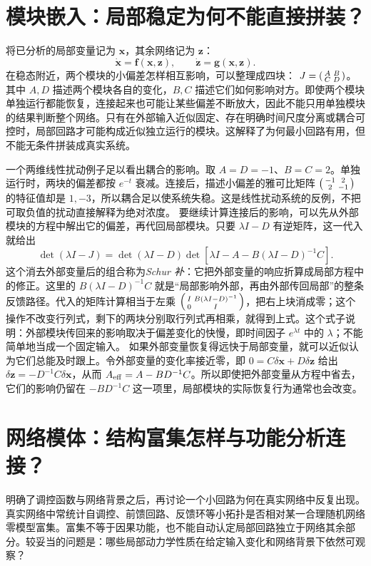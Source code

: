 \section{模块嵌入：局部稳定为何不能直接拼装？}
将已分析的局部变量记为 $\bm x$，其余网络记为 $\bm z$：
\begin{equation}\dot{\bm x}=\bm f(\bm x,\bm z),\qquad\dot{\bm z}=\bm g(\bm x,\bm z).\end{equation}
在稳态附近，两个模块的小偏差怎样相互影响，可以整理成四块： $J=\begin{psmallmatrix}A&B\\C&D\end{psmallmatrix}$。其中 $A,D$ 描述两个模块各自的变化，$B,C$ 描述它们如何影响对方。即使两个模块单独运行都能恢复，连接起来也可能让某些偏差不断放大，因此不能只用单独模块的结果判断整个网络。只有在外部输入近似固定、存在明确时间尺度分离或耦合可控时，局部回路才可能构成近似独立运行的模块。这解释了为何最小回路有用，但不能无条件拼装成真实系统。

一个两维线性扰动例子足以看出耦合的影响。取 $A=D=-1$、$B=C=2$。单独运行时，两块的偏差都按 $e^{-t}$ 衰减。连接后，描述小偏差的雅可比矩阵
$\begin{psmallmatrix}-1&2\\2&-1\end{psmallmatrix}$ 的特征值却是 $1,-3$，所以耦合足以使系统失稳。这是线性扰动系统的反例，不把可取负值的扰动直接解释为绝对浓度。
要继续计算连接后的影响，可以先从外部模块的方程中解出它的偏差，再代回局部模块。只要 $\lambda I-D$ 有逆矩阵，这一代入就给出
\[
\det(\lambda I-J)=\det(\lambda I-D)
\det\left[\lambda I-A-B(\lambda I-D)^{-1}C\right].
\]
这个消去外部变量后的组合称为\emph{Schur 补}：它把外部变量的响应折算成局部方程中的修正。这里的 $B(\lambda I-D)^{-1}C$ 就是“局部影响外部，再由外部传回局部”的整条反馈路径。代入的矩阵计算相当于左乘 $\begin{psmallmatrix}I&B(\lambda I-D)^{-1}\\0&I\end{psmallmatrix}$，把右上块消成零；这个操作不改变行列式，剩下的两块分别取行列式再相乘，就得到上式。这个式子说明：外部模块传回来的影响取决于偏差变化的快慢，即时间因子 $e^{\lambda t}$ 中的 $\lambda$；不能简单地当成一个固定输入。
如果外部变量恢复得远快于局部变量，就可以近似认为它们总能及时跟上。令外部变量的变化率接近零，即 $0=C\delta\bm x+D\delta\bm z$ 给出 $\delta\bm z=-D^{-1}C\delta\bm x$，从而 $A_{\rm eff}=A-BD^{-1}C$。所以即使把外部变量从方程中省去，它们的影响仍留在 $-BD^{-1}C$ 这一项里，局部模块的实际恢复行为通常也会改变。

\section{网络模体：结构富集怎样与功能分析连接？}
明确了调控函数与网络背景之后，再讨论一个小回路为何在真实网络中反复出现。
真实网络中常统计自调控、前馈回路、反馈环等小拓扑是否相对某一合理随机网络零模型富集。富集不等于因果功能，也不能自动认定局部回路独立于网络其余部分。较妥当的问题是：哪些局部动力学性质在给定输入变化和网络背景下依然可观察？

